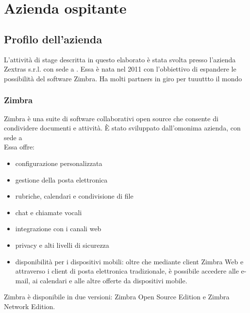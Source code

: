 \chapter{Azienda ospitante}

\section{Profilo dell'azienda}
L'attività di stage descritta in questo elaborato è stata svolta presso l'azienda Zextras s.r.l. con sede a  . Essa è nata nel 2011 con l'obbiettivo di espandere le possibilità del software Zimbra.
Ha molti partners in giro per tuuuttto il mondo

\subsection{Zimbra}
Zimbra è una suite di software collaborativi open source che consente di condividere documenti e attività. È stato sviluppato dall'omonima azienda, con sede a  \\
Essa offre:
\begin{itemize}
	\item configurazione personalizzata
	\item gestione della posta elettronica
	\item rubriche, calendari e condivisione di file
	\item chat e chiamate vocali
	\item integrazione con i canali web
	\item privacy e alti livelli di sicurezza
	\item disponibilità per i dispositivi mobili: oltre che mediante client Zimbra Web e attraverso i client di posta elettronica tradizionale, è possibile accedere alle e-mail, ai calendari e alle altre offerte da dispositivi mobile. 
\end{itemize}
Zimbra è disponibile in due versioni: Zimbra Open Source Edition e Zimbra Network Edition. 

